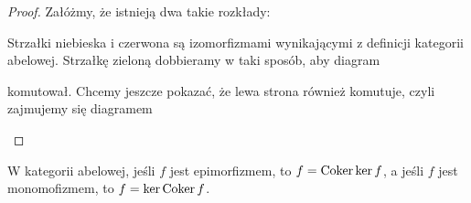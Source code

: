 \begin{proof}
  Załóżmy, że istnieją dwa takie rozkłady:
  
  \begin{center}\end{center}
  Strzałki {\color{blue}niebieska} i {\color{red}czerwona} są izomorfizmami wynikającymi z definicji kategorii abelowej. Strzałkę {\color{green}zieloną} dobbieramy w taki sposób, aby diagram
  
  \begin{center}\end{center}
  komutował. Chcemy jeszcze pokazać, że lewa strona również komutuje, czyli zajmujemy się diagramem

  \begin{center}\end{center}

\end{proof}

\begin{lemma}\label{lemat 5.2}
  W kategorii abelowej, jeśli $f$ jest epimorfizmem, to $f=\operatorname{Coker}\ker f$, a jeśli $f$ jest monomofizmem, to $f=\ker\operatorname{Coker} f$.
\end{lemma}

